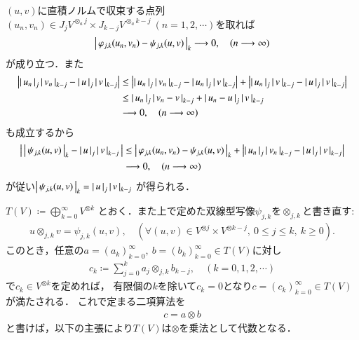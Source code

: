 	\begin{prf}
		$(u,v)$に直積ノルムで収束する点列$(u_n,v_n) \in J_j V^{\otimes_a j} \times J_{k-j} V^{\otimes_a k-j}\ (n=1,2,\cdots)$を取れば
		\begin{align}
			\left|\, \varphi_{j,k}(u_n,v_n) - \psi_{j,k}(u,v)\, \right|_{k} \longrightarrow 0,
			\quad (n \longrightarrow \infty)
		\end{align}
		が成り立つ．また
		\begin{align}
			\left| \left|\, u_n\, \right|_{j} \left|\, v_n\, \right|_{k-j} - 
			\left|\, u\, \right|_{j} \left|\, v\, \right|_{k-j} \right|
			&\leq \left| \left|\, u_n\, \right|_{j} \left|\, v_n\, \right|_{k-j} - 
			\left|\, u_n\, \right|_{j} \left|\, v\, \right|_{k-j} \right| 
			+ \left| \left|\, u_n\, \right|_{j} \left|\, v\, \right|_{k-j} - 
			\left|\, u\, \right|_{j} \left|\, v\, \right|_{k-j} \right| \\
			&\leq \left|\, u_n\, \right|_{j} \left|\, v_n - v\, \right|_{k-j} 
			+ \left|\, u_n - u\, \right|_{j} \left|\, v\, \right|_{k-j} \\
			&\longrightarrow 0, \quad (n \longrightarrow \infty)
		\end{align}
		も成立するから
		\begin{align}
			\left|\, \left|\, \psi_{j,k}(u,v)\, \right|_{k} - \left|\, u\, \right|_{j} \left|\, v\, \right|_{k-j}\, \right|
			&\leq \left|\, \varphi_{j,k}(u_n,v_n) - \psi_{j,k}(u,v)\, \right|_{k}
				+ \left| \left|\, u_n\, \right|_{j} \left|\, v_n\, \right|_{k-j} - 
			\left|\, u\, \right|_{j} \left|\, v\, \right|_{k-j} \right| \\
			& \longrightarrow 0, \quad (n \longrightarrow \infty)
		\end{align}
		が従い$\left|\, \psi_{j,k}(u,v)\, \right|_{k} = \left|\, u\, \right|_{j} \left|\, v\, \right|_{k-j}$
		が得られる．
		\QED
	\end{prf}
	
	$T(V) \coloneqq \bigoplus_{k=0}^{\infty} V^{\otimes k}$
	とおく．また上で定めた双線型写像$\psi_{j,k}$を$\otimes_{j,k}$と書き直す:
	\begin{align}
		u \otimes_{j,k} v = \psi_{j,k}(u,v),
		\quad (\forall (u,v) \in V^{\otimes j} \times V^{\otimes k-j},\ 0 \leq j \leq k,\ k \geq 0).
		\label{eq:def_of_otimes_for_completion_V_tensor_k}
	\end{align}
	このとき，任意の$a=(a_k)_{k=0}^{\infty},\ b=(b_k)_{k=0}^{\infty} \in T(V)$に対し
	\begin{align}
		c_k \coloneqq \sum_{j=0}^{k} a_j \otimes_{j,k} b_{k-j},
		\quad (k=0,1,2,\cdots)
	\end{align}
	で$c_k \in V^{\otimes k}$を定めれば，
	有限個の$k$を除いて$c_k = 0$となり$c = (c_k)_{k=0}^{\infty} \in T(V)$が満たされる．
	これで定まる二項算法を
	\begin{align}
		c = a \otimes b
	\end{align}
	と書けば，以下の主張により$T(V)$は$\otimes$を乗法として代数となる．
	
